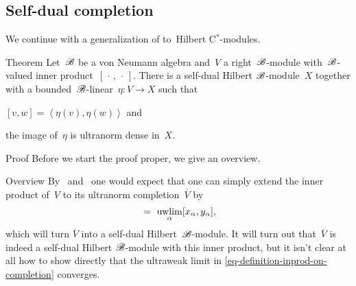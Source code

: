 \subsection{Self-dual completion}
\begin{parsec}%
\begin{point}%
We continue with a generalization of
to~Hilbert C$^*$-modules.
\end{point}
\begin{point}{Theorem}%
Let~$\mathscr{B}$ be a von Neumann algebra
and~$V$ a right~$\mathscr{B}$-module with~$\mathscr{B}$-valued
    inner product~$[\,\cdot\,,\,\cdot\,]$.
There is a self-dual Hilbert $\mathscr{B}$-module~$X$
    together with a bounded~$\mathscr{B}$-linear~$\eta\colon V \to X$
    such that \begin{inparaenum}
    \item $[v,w] = \left<\eta (v),\eta(w)\right>$
    and \item the image of~$\eta$ is ultranorm dense in~$X$.
    \end{inparaenum}
\begin{point}{Proof}%
Before we start the proof proper,
    we give an overview.
\begin{point}{Overview}
By~ and~
    one would expect that
    one can simply extend the inner product of~$V$
    to its ultranorm completion~$\overline{V}$
    by
    \begin{equation}
        [(x_\alpha)_\alpha, (y_\alpha)_\alpha] \ =\  \uwlim_\alpha [x_\alpha,y_\alpha], \label{eq-definition-inprod-on-completion}
    \end{equation}
    which will turn $\overline{V}$ into a self-dual Hilbert~$\mathscr{B}$-module.
It will turn out that~$\overline{V}$
    is indeed a self-dual Hilbert $\mathscr{B}$-module
    with this inner product,
    but it isn't clear at all  how to show directly that the ultraweak limit
    in \eqref{eq-definition-inprod-on-completion} converges.


\end{point}
\end{point}
\end{point}
\end{parsec}
